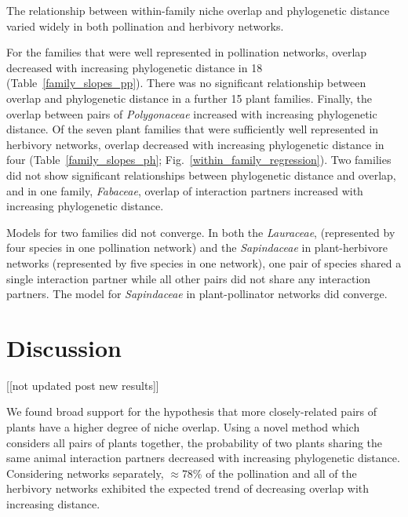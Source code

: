 \documentclass[12pt]{article}
\begin{document}
\begin{spacing}{1.5}
    The relationship between within-family niche overlap and phylogenetic distance
    varied widely in both pollination and herbivory networks. 


    For the families
    that were well represented in pollination networks, overlap decreased
    with increasing phylogenetic distance in 18 (Table~\ref{family_slopes_pp}).
    There was no significant relationship between overlap and phylogenetic distance in
    a further 15 plant families. Finally, the overlap between pairs of \emph{Polygonaceae}
    increased with increasing phylogenetic distance. 
    Of the seven plant families that were sufficiently well represented in herbivory 
    networks, overlap decreased with increasing phylogenetic distance in four 
    (Table~\ref{family_slopes_ph}; Fig.~\ref{within_family_regression}). Two
    families did not show significant relationships between phylogenetic distance and overlap,
    and in one family, \emph{Fabaceae}, overlap of interaction partners increased with 
    increasing phylogenetic distance.


    Models for two families did not converge. In both the \emph{Lauraceae}, (represented by four species in one pollination network) and the \emph{Sapindaceae} in plant-herbivore networks (represented by five species in one network), one pair of species shared a single interaction partner while all other pairs did not share any interaction partners. The model for \emph{Sapindaceae} in plant-pollinator networks did converge.


\section*{Discussion} [[not updated post new results]]

  We found broad support for the hypothesis that more
  closely-related pairs of plants have a higher degree
  of niche overlap. Using a novel method which considers
  all pairs of plants together, 
  the probability of two plants sharing the same animal 
  interaction partners decreased with increasing 
  phylogenetic distance. Considering networks separately,
  $\approx$78\%  of the pollination and all of the 
  herbivory networks exhibited the expected trend of decreasing 
  overlap with increasing distance. 



\end{spacing}
\end{document}
